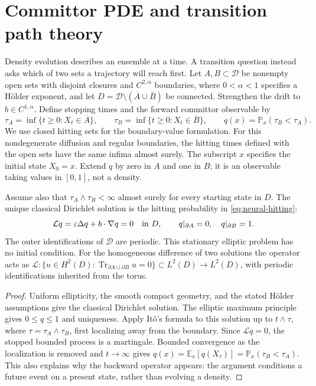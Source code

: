 \documentclass[12pt,a4paper,oneside]{book}
\begin{document}
\section{Committor PDE and transition path theory}
\label{subsec:neural-committor}

Density evolution describes an ensemble at a time. A transition question instead asks which of two sets a trajectory
will reach first. Let $A,B\subset\mathcal D$ be nonempty open sets with disjoint closures and $C^{2,\alpha}$ boundaries,
where $0<\alpha<1$ specifies a H\"older exponent, and let
$D=\mathcal D\setminus(\overline A\cup\overline B)$ be connected. Strengthen the drift to $b\in C^{1,\alpha}$.
Define stopping times and the forward committor observable by
\begin{equation}
 \tau_A=\inf\{t\ge0:X_t\in\overline A\},\qquad
 \tau_B=\inf\{t\ge0:X_t\in\overline B\},\qquad
 q(x)=\mathbb P_x(\tau_B<\tau_A).
 \label{eq:neural-hitting}
\end{equation}
We use closed hitting sets for the boundary-value formulation. For this nondegenerate diffusion and regular boundaries,
the hitting times defined with the open sets have the same infima almost surely. The subscript $x$ specifies the initial
state $X_0=x$. Extend $q$ by zero in $A$ and one in $B$; it is an observable taking values in $[0,1]$, not a density.

\begin{proposition}
\label{prop:neural-committor}
Assume also that $\tau_A\wedge\tau_B<\infty$ almost surely for every starting state in $D$.
The unique classical Dirichlet solution is the hitting probability in \eqref{eq:neural-hitting}:
\begin{equation}
 \mathcal Lq=\varepsilon\Delta q+b\cdot\nabla q=0\quad\hbox{in }D,
 \qquad q|_{\partial A}=0,\quad q|_{\partial B}=1.
 \label{eq:neural-committor}
\end{equation}
The outer identifications of $\mathcal D$ are periodic. This stationary elliptic problem has no initial condition.
For the homogeneous difference of two solutions the operator acts as
$\mathcal L:\{u\in H^2(D):\operatorname{Tr}_{\partial A\cup\partial B}u=0\}
\subset L^2(D)\to L^2(D)$, with periodic identifications inherited from the torus.
\end{proposition}
\begin{proof}
Uniform ellipticity, the smooth compact geometry, and the stated H\"older assumptions give the classical Dirichlet
solution. The elliptic maximum principle gives $0\le q\le1$ and uniqueness. Apply It\^o's formula to this solution
up to $t\wedge\tau$, where $\tau=\tau_A\wedge\tau_B$, first localizing away from the boundary. Since $\mathcal Lq=0$,
the stopped bounded process is a martingale. Bounded convergence as the localization is removed and $t\to\infty$ gives
$q(x)=\mathbb E_x[q(X_\tau)]=\mathbb P_x(\tau_B<\tau_A)$. This also explains why the backward operator appears:
the argument conditions a future event on a present state, rather than evolving a density.
\end{proof}
\end{document}
